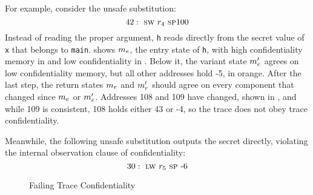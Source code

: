 \documentclass[acmsmall,review,anonymous]{acmart}\settopmatter{printfolios=true,printccs=false,printacmref=false}
\begin{document}
For example, consider the unsafe substitution:
\[
42 : ~ \textsc{sw} ~ r_4 ~ \textsc{sp} 100
\]
Instead of reading the proper argument, {\tt h} reads directly from the
secret value of {\tt x} that belongs to {\tt main}. 
shows \(m_e\), the entry state of {\tt h}, with high confidentiality memory
in {\high} and low confidentiality in \low. Below it, the variant state
\(m_e'\) agrees on low confidentiality memory, but all other addresses
hold -5, in orange. After the last step, the return states \(m_r\) and
\(m_r'\) should agree on every component that changed since \(m_e\) or
\(m_e'\). Addresses 108 and 109 have changed, shown in \tainted, and while 109
is consistent, 108 holds either 43 or -4, so the trace does not obey
trace confidentiality.

Meanwhile, the following unsafe substitution outputs the secret
directly, violating the internal observation clause of confidentiality:
\[
30 : ~ \textsc{lw} ~ r_5 ~ \textsc{sp} ~ \textrm{-} 6
\]

\begin{figure}
  \confidentialityendexample
  \caption{Failing Trace Confidentiality}
  \label{fig:confex}
\end{figure}

\end{document}
